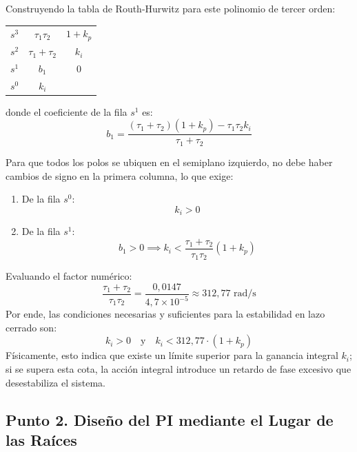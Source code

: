 \documentclass[11pt,a4paper]{article}
\begin{document}
Construyendo la tabla de Routh-Hurwitz para este polinomio de tercer orden:
\begin{table}[H]
\centering
\begin{tabular}{c | c c}
$s^3$ & $\tau_1 \tau_2$ & $1 + k_p$ \\
$s^2$ & $\tau_1 + \tau_2$ & $k_i$ \\
$s^1$ & $b_1$ & $0$ \\
$s^0$ & $k_i$ & 
\end{tabular}
\end{table}

donde el coeficiente de la fila $s^1$ es:
\begin{equation}
    b_1 = \frac{(\tau_1 + \tau_2)(1 + k_p) - \tau_1 \tau_2 k_i}{\tau_1 + \tau_2}
\end{equation}

Para que todos los polos se ubiquen en el semiplano izquierdo, no debe haber cambios de signo en la primera columna, lo que exige:
\begin{enumerate}
    \item De la fila $s^0$:
    \begin{equation}
        k_i > 0
    \end{equation}
    \item De la fila $s^1$:
    \begin{equation}
        b_1 > 0 \implies k_i < \frac{\tau_1 + \tau_2}{\tau_1 \tau_2} (1 + k_p)
    \end{equation}
\end{enumerate}

Evaluando el factor numérico:
\begin{equation}
    \frac{\tau_1 + \tau_2}{\tau_1 \tau_2} = \frac{0{,}0147}{4{,}7\times 10^{-5}} \approx 312{,}77\text{ rad/s}
\end{equation}
Por ende, las condiciones necesarias y suficientes para la estabilidad en lazo cerrado son:
\begin{equation}
    k_i > 0 \quad \text{y} \quad k_i < 312{,}77 \cdot (1 + k_p)
\end{equation}
Físicamente, esto indica que existe un límite superior para la ganancia integral $k_i$; si se supera esta cota, la acción integral introduce un retardo de fase excesivo que desestabiliza el sistema.

\subsection*{Punto 2. Diseño del PI mediante el Lugar de las Raíces}
\end{document}
